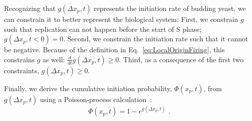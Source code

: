		Recognizing that $g(\Delta x_p,t)$ represents the initiation rate of budding yeast, we can constrain it to better represent the biological system:
		First, we constrain $g$ such that replication can not happen before the start of S phase; $g(\Delta x_p,t<0)=0$.
		Second, we constrain the initiation rate such that it cannot be negative. Because of the definition in Eq.~\ref{eq:LocalOriginFiring}, this constrains $g$ as well: $\frac{d}{dt}g(\Delta x_p,t)\geq 0$.
		Third, as a consequence of the first two constraints, $g(\Delta x_p,t)\geq 0$.
		
		Finally, we derive the cumulative initiation probability, $\Phi(x_p,t)$, from $g(\Delta x_p,t)$ using a Poisson-process calculation~\cite{Spikes}:
		\begin{equation} \label{eq:PhiFromG}
			\Phi\left( x_p,t\right) = 1 - e^{g\left(\Delta x_p,t\right)} \text{ .}
		\end{equation}
